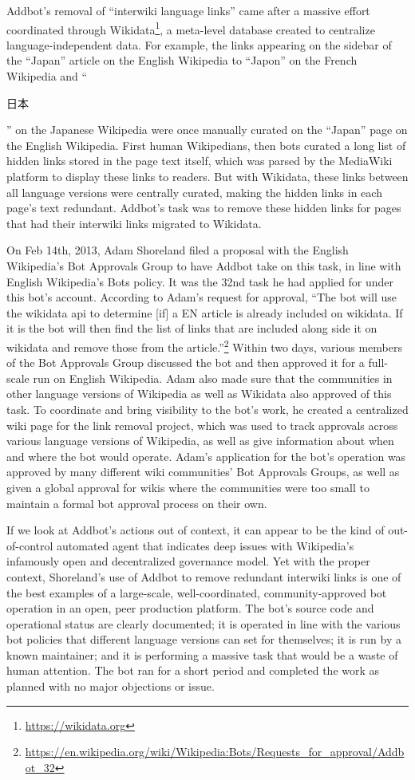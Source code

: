 \documentclass[format=acmsmall, review=false, screen=true]{acmart}%
\begin{document}
Addbot's removal of ``interwiki language links'' came after a massive effort coordinated through Wikidata\footnote{ \url{https://wikidata.org} }, a meta-level database created to centralize language-independent data. For example, the links appearing on the sidebar of the ``Japan'' article on the English Wikipedia to ``Japon'' on the French Wikipedia and ``\begin{CJK}{UTF8}{min}日本\end{CJK}'' on the Japanese Wikipedia were once manually curated on the ``Japan'' page on the English Wikipedia. First human Wikipedians, then bots curated a long list of hidden links stored in the page text itself, which was parsed by the MediaWiki platform to display these links to readers. But with Wikidata, these links between all language versions were centrally curated, making the hidden links in each page's text redundant. Addbot's task was to remove these hidden links for pages that had their interwiki links migrated to Wikidata.

On Feb 14th, 2013, Adam Shoreland filed a proposal with the English Wikipedia's Bot Approvals Group to have Addbot take on this task, in line with English Wikipedia's Bots policy. It was the 32nd task he had applied for under this bot's account. According to Adam's request for approval, ``The bot will use the wikidata api to determine [if] a EN article is already included on wikidata. If it is the bot will then find the list of links that are included along side it on wikidata and remove those from the article.''\footnote{ \url{https://en.wikipedia.org/wiki/Wikipedia:Bots/Requests_for_approval/Addbot_32}} Within two days, various members of the Bot Approvals Group discussed the bot and then approved it for a full-scale run on English Wikipedia. Adam also made sure that the communities in other language versions of Wikipedia as well as Wikidata also approved of this task. To coordinate and bring visibility to the bot's work, he created a centralized wiki page for the link removal project, which was used to track approvals across various language versions of Wikipedia, as well as give information about when and where the bot would operate. Adam's application for the bot's operation was approved by many different wiki communities' Bot Approvals Groups, as well as given a global approval for wikis where the communities were too small to maintain a formal bot approval process on their own.

If we look at Addbot's actions out of context, it can appear to be the kind of out-of-control automated agent that indicates deep issues with Wikipedia's infamously open and decentralized governance model. Yet with the proper context, Shoreland's use of Addbot to remove redundant interwiki links is one of the best examples of a large-scale, well-coordinated, community-approved bot operation in an open, peer production platform. The bot's source code and operational status are clearly documented; it is operated in line with the various bot policies that different language versions can set for themselves; it is run by a known maintainer; and it is performing a massive task that would be a waste of human attention. The bot ran for a short period and completed the work as planned with no major objections or issue. 
\end{document}
